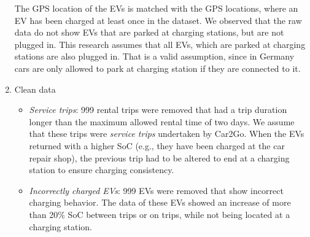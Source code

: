 \documentclass[a4paper, 12pt]{article}
\begin{document}
\begin{enumerate}
The GPS location of the EVs is matched with the GPS locations, where an EV
has been charged at least once in the dataset. We observed that the raw data
do not show EVs that are parked at charging stations, but are not plugged in.
This research assumes that all EVs, which are parked at charging stations are
also plugged in. That is a valid assumption, since in Germany cars are only
allowed to park at charging station if they are connected to it.
\item Clean data
\begin{itemize}
\item \emph{Service trips}: 999 rental trips were removed that had a trip duration
longer than the maximum allowed rental time of two days. We assume that
these trips were \emph{service trips} undertaken by Car2Go. When the EVs
returned with a higher SoC (e.g., they have been charged at the car repair
shop), the previous trip had to be altered to end at a charging station to
ensure charging consistency.
\item \emph{Incorrectly charged EVs}: 999 EVs were removed that show incorrect
charging behavior. The data of these EVs showed an increase of more than
20\% SoC between trips or on trips, while not being located at a charging
station.
\end{itemize}
\end{enumerate}
\end{document}
